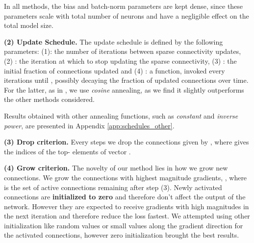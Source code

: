 \documentclass{article}
\begin{document}
In all methods, the bias and batch-norm parameters are kept dense, since these parameters scale with total number of neurons and have a negligible effect on the total model size.

\textbf{(2) Update Schedule.} The update schedule is defined by the following parameters: (1): the number of iterations between sparse connectivity updates, (2) : the iteration at which to stop updating the sparse connectivity, (3) : the initial fraction of connections updated and (4) : a function, invoked every  iterations until , possibly decaying the fraction of updated connections over time. For the latter, as in \citet{dettmers2019}, we use \textit{cosine} annealing, as we find it slightly outperforms the other methods considered.


Results obtained with other annealing functions, such as \textit{constant} and \textit{inverse power}, are presented in Appendix \ref{app:schedules_other}.

\setlength{\tabcolsep}{0.3em}
\newcommand{\ci}[1]{\small{#1}}


\textbf{(3) Drop criterion.} Every  steps we drop the connections given by , where  gives the indices of the top- elements of vector .

\textbf{(4) Grow criterion.} The novelty of our method lies in how we grow new connections. We grow the connections with highest magnitude gradients, , where   is the set of active connections remaining after step (3). Newly activated connections are \textbf{initialized to zero} and therefore don't affect the output of the network. However they are expected to receive gradients with high magnitudes in the next iteration and therefore reduce the loss fastest. We attempted using other initialization like random values or small values along the gradient direction for the activated connections, however zero initialization brought the best results.
\end{document}
